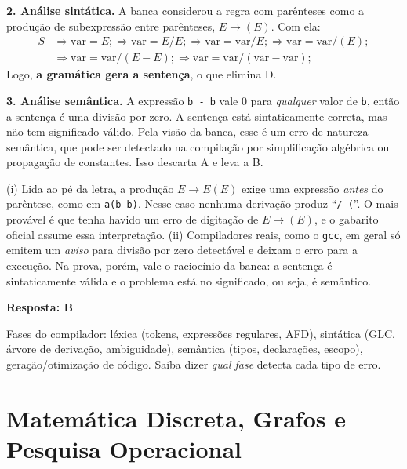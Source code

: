 \documentclass[11pt,a4paper]{article}
\newcommand{\resposta}[1]{\begin{gabarito}\textbf{Resposta: #1}\end{gabarito}}
\begin{document}
\textbf{2. Análise sintática.} A banca considerou a regra com parênteses como a produção de
subexpressão entre parênteses, $E \to (E)$. Com ela:
\begin{align*}
S &\Rightarrow \textrm{var} = E; \Rightarrow \textrm{var} = E / E; \Rightarrow \textrm{var} = \textrm{var} / E;
   \Rightarrow \textrm{var} = \textrm{var} / (E);\\
  &\Rightarrow \textrm{var} = \textrm{var} / (E - E);
   \Rightarrow \textrm{var} = \textrm{var} / (\textrm{var} - \textrm{var});
\end{align*}
Logo, \textbf{a gramática gera a sentença}, o que elimina D.

\textbf{3. Análise semântica.} A expressão \texttt{b - b} vale 0 para \emph{qualquer} valor de
\texttt{b}, então a sentença é uma divisão por zero. A sentença está sintaticamente correta, mas não tem
significado válido. Pela visão da banca, esse é um erro de natureza semântica, que pode ser detectado
na compilação por simplificação algébrica ou propagação de constantes. Isso descarta A e leva a B.

\begin{tcolorbox}[colback=yellow!8,colframe=yellow!50!black,boxrule=0.5pt,title=Ressalvas sobre esta questão,fonttitle=\bfseries\small]
\small
(i) Lida ao pé da letra, a produção $E \to E(E)$ exige uma expressão \emph{antes} do parêntese, como em
\texttt{a(b-b)}. Nesse caso nenhuma derivação produz ``\texttt{/ (}''. O mais provável é que tenha
havido um erro de digitação de $E \to (E)$, e o gabarito oficial assume essa interpretação.
(ii) Compiladores reais, como o \texttt{gcc}, em geral só emitem um \emph{aviso} para divisão por zero
detectável e deixam o erro para a execução. Na prova, porém, vale o raciocínio da banca: a sentença é
sintaticamente válida e o problema está no significado, ou seja, é semântico.
\end{tcolorbox}

\resposta{B}

\begin{dica}
Fases do compilador: léxica (tokens, expressões regulares, AFD), sintática (GLC, árvore de derivação,
ambiguidade), semântica (tipos, declarações, escopo), geração/otimização de código. Saiba dizer
\emph{qual fase} detecta cada tipo de erro.
\end{dica}

\section{Matemática Discreta, Grafos e Pesquisa Operacional}
\end{document}
